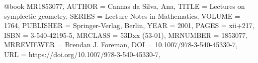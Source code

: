 @book {MR1853077,
	AUTHOR = {Cannas da Silva, Ana},
	TITLE = {Lectures on symplectic geometry},
	SERIES = {Lecture Notes in Mathematics},
	VOLUME = {1764},
	PUBLISHER = {Springer-Verlag, Berlin},
	YEAR = {2001},
	PAGES = {xii+217},
	ISBN = {3-540-42195-5},
	MRCLASS = {53Dxx (53-01)},
	MRNUMBER = {1853077},
	MRREVIEWER = {Brendan J. Foreman},
	DOI = {10.1007/978-3-540-45330-7},
	URL = {https://doi.org/10.1007/978-3-540-45330-7},
}